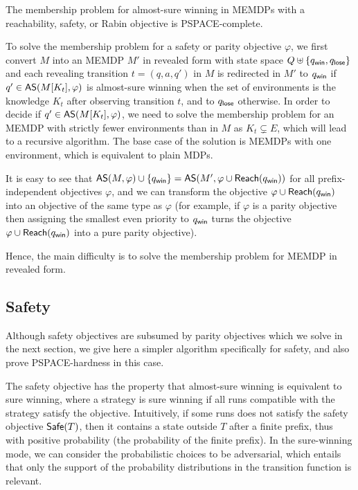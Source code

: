 \documentclass[a4paper,USenglish,cleveref, autoref, thm-restate]{lipics-v2021}
\newcommand\almostsure{\textrm{\sf AS}}
\newcommand\Safe{\textrm{\sf Safe}}
\newcommand\Reach{\textrm{\sf Reach}}
\def\loseabsorb{q_{\sf lose}}
\def\winabsorb{q_{\sf win}}
\begin{document}
\begin{theorem}\label{thm:pspacehard}
    The membership problem for almost-sure winning in MEMDPs with a reachability, safety, or Rabin  
    objective is PSPACE-complete.
\end{theorem}



To solve the membership problem for a safety or parity objective $\varphi$, 
we first convert $M$ into an MEMDP $M'$ 
in revealed form with state space $Q \uplus \{\winabsorb, \loseabsorb \}$ and 
each revealing transition $t=(q,a,q')$ in $M$ is redirected in $M'$ to $\winabsorb$
if $q' \in \almostsure(M[K_t], \varphi)$ is almost-sure winning when the 
set of environments is the knowledge $K_t$ after observing transition $t$,
and to $\loseabsorb$ otherwise. In order to decide if $q' \in \almostsure(M[K_t], \varphi)$,
we need to solve the membership problem for an MEMDP with strictly fewer
environments than in $M$ as $K_t \subsetneq E$, 
which will lead to a recursive algorithm. 
The base case of the solution is MEMDPs with one environment,
which is equivalent to plain MDPs.

It is easy to see that $\almostsure(M, \varphi) \cup \{\winabsorb\} = 
\almostsure(M', \varphi \cup \Reach(\winabsorb))$
for all prefix-independent objectives $\varphi$,
and we can transform the objective $\varphi \cup \Reach(\winabsorb)$
into an objective of the same type as $\varphi$ (for example, if $\varphi$
is a parity objective then assigning the smallest even priority to 
$\winabsorb$ turns the objective $\varphi \cup \Reach(\winabsorb)$
into a pure parity objective).

Hence, the main difficulty is to solve the membership problem for MEMDP 
in revealed form.

\subsection{Safety}\label{section:as-safety}

Although safety objectives are subsumed by parity objectives which we solve in the next
section, we give here a simpler algorithm specifically for safety, and also prove PSPACE-hardness
in this case.

The safety objective has the property that almost-sure winning is equivalent
to sure winning, where a strategy is sure winning if all runs compatible with 
the strategy satisfy the objective. Intuitively, if some runs does not
satisfy the safety objective $\Safe(T)$, then it contains a state outside $T$ 
after a finite prefix, thus with positive probability (the probability
of the finite prefix). 
In the sure-winning mode, we can consider
the probabilistic choices to be adversarial, which entails that only 
the support of the probability distributions in the transition function
is relevant.
\end{document}
